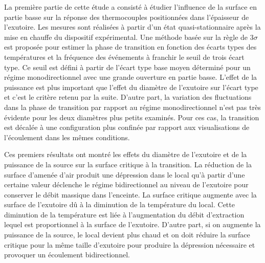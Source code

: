 La première partie de cette étude a consisté à étudier l'influence de la surface en partie basse sur la réponse des thermocouples positionnées dans l'épaisseur de l'exutoire. Les mesures sont réalisées à partir d'un état quasi-stationnaire après la mise en chauffe du dispositif expérimental. Une méthode basée sur la règle de $3\sigma$ est proposée pour estimer la phase de transition en fonction des écarts types des températures et la fréquence des événements à franchir le seuil de trois écart type. Ce seuil est défini à partir de l'écart type base moyen déterminé pour un régime monodirectionnel avec une grande ouverture en partie basse. L'effet de la puissance est plus important que l'effet du diamètre de l'exutoire sur l'écart type et c'est le critère retenu par la suite. D'autre part, la variation des fluctuations dans la phase de transition par rapport au régime monodirectionnel n'est pas très évidente pour les deux diamètres plus petits examinés. Pour ces cas, la transition est décalée à une configuration plus confinée par rapport aux visualisations de l'écoulement dans les mêmes conditions.

Ces premiers résultats ont montré les effets du diamètre de l'exutoire et de la puissance de la source sur la surface critique à la transition. La réduction de la surface d'amenée d'air produit une dépression dans le local qu'à partir d'une certaine valeur déclenche le régime bidirectionnel au niveau de l'exutoire pour conserver le débit massique dans l'enceinte. La surface critique augmente avec la surface de l'exutoire dû à la diminution de la température du local. Cette diminution de la température est liée à l'augmentation du débit d'extraction lequel est proportionnel à la surface de l'exutoire. D'autre part, si on augmente la puissance de la source, le local devient plus chaud et on doit réduire la surface critique pour la même taille d'exutoire pour produire la dépression nécessaire et provoquer un écoulement bidirectionnel.

